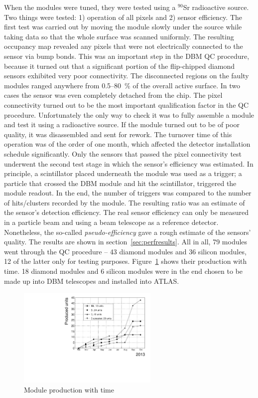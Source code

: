 \documentclass[12pt]{packages/mytustyle}  %
\begin{document}
When the modules were tuned, they were tested using a $^{90}$Sr radioactive source. Two things were tested: 1) operation of all pixels and 2) sensor efficiency. The first test was carried out by moving the module slowly under the source while taking data so that the whole surface was scanned uniformly. The resulting occupancy map revealed any pixels that were not electrically connected to the sensor via bump bonds. This was an important step in the DBM QC procedure, because it turned out that a significant portion of the flip-chipped diamond sensors exhibited very poor connectivity. The disconnected regions on the faulty modules ranged anywhere from 0.5--80~\% of the overall active surface. In two cases the sensor was even completely detached from the chip. The pixel connectivity turned out to be the most important qualification factor in the QC procedure. Unfortunately the only way to check it was to fully assemble a module and test it using a radioactive source. If the module turned out to be of poor quality, it was disassembled and sent for rework. The turnover time of this operation was of the order of one month, which affected the detector installation schedule significantly. Only the sensors that passed the pixel connectivity test underwent the second test stage in which the sensor's efficiency was estimated. In principle, a scintillator placed underneath the module was used as a trigger; a particle that crossed the DBM module and hit the scintillator, triggered the module readout. In the end, the number of triggers was compared to the number of hits/clusters recorded by the module. The resulting ratio was an estimate of the sensor's detection efficiency. The real sensor efficiency can only be measured in a particle beam and using a beam telescope as a reference detector. Nonetheless, the so-called \emph{pseudo-efficiency} gave a rough estimate of the sensors' quality. The results are shown in section~\ref{sec:perfresults}.  All in all, 79 modules went through the QC procedure -- 43 diamond modules and 36 silicon modules, 12 of the latter only for testing purposes. Figure~\ref{fig:production} shows their production with time. 18 diamond modules and 6 silicon modules were in the end chosen to be made up into DBM telescopes and installed into ATLAS.
\begin{figure}[!t]
\centering
\includegraphics[width=0.6\textwidth]{../../scripts/04_charge_monitoring/plots/production}
\caption{Module production with time}
\label{fig:production}
\end{figure}
\end{document}
